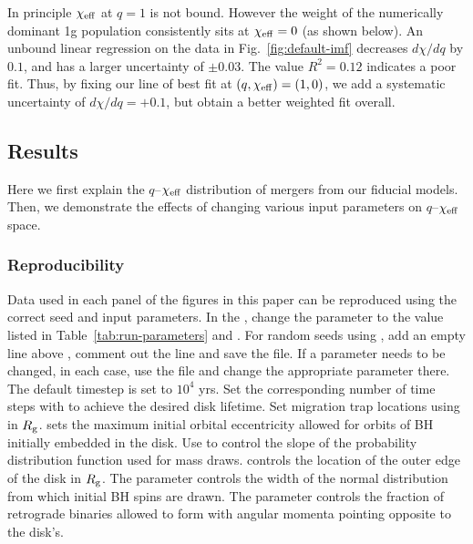 In principle $\chi_{\rm eff}$ at $q=1$ is not bound.
However the weight of the numerically dominant 1g population consistently sits at $\chi_{\rm eff}=0$ (as shown below).
An unbound linear regression on the data in Fig.~\ref{fig:default-imf} decreases $d\chi/dq$ by $0.1$, and has a larger uncertainty of $\pm0.03$.
The value $R^2=0.12$ indicates a poor fit.
Thus, by fixing our line of best fit at $(q,\chi_{\rm eff})=(1,0)$, we add a systematic uncertainty of $d\chi/dq=+0.1$, but obtain a better weighted fit overall.


\subsection{Results}
\label{sec:results-qxeff}
Here we first explain the $q$--$\chi_{\rm eff}$ distribution of mergers from our fiducial models.
Then, we demonstrate the effects of changing various input parameters on $q$--$\chi_{\rm eff}$ space.

\subsubsection{Reproducibility}
Data used in each panel of the figures in this paper can be reproduced using the correct seed and input parameters.
In the , change the  parameter to the value listed in Table~\ref{tab:run-parameters} and .
For random seeds using , add an empty line above , comment out the  line and save the file.
If a parameter needs to be changed, in each case, use the  file and change the appropriate parameter there.
The default timestep is set to $10^4$ yrs.
Set the corresponding number of time steps with  to achieve the desired disk lifetime.
Set migration trap locations using  in $R_{\rm g}$.
 sets the maximum initial orbital eccentricity allowed for orbits of BH initially embedded in the disk.
Use  to control the slope of the probability distribution function used for mass draws.
 controls the location of the outer edge of the disk in $R_{\rm g}$.
The parameter  controls the width of the normal distribution from which initial BH spins are drawn.
The parameter  controls the fraction of retrograde binaries allowed to form with angular momenta pointing opposite to the disk's.

